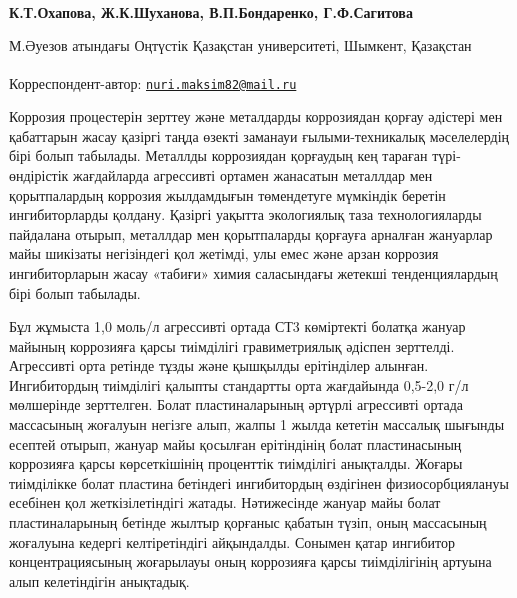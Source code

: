 
\begin{articleheader}


{\bfseries К.Т.Охапова\textsuperscript{\envelope }, Ж.К.Шуханова, В.П.Бондаренко,
Г.Ф.Сагитова}
\end{articleheader}
\begin{affiliation}

М.Әуезов атындағы Оңтүстік Қазақстан университеті, Шымкент, Қазақстан

\raggedright {\bfseries \textsuperscript{\envelope }}Корреспондент-автор:
\href{mailto:nuri.maksim82@mail.ru}{\nolinkurl{nuri.maksim82@mail.ru}}
\end{affiliation}

Коррозия процестерін зерттеу және металдарды коррозиядан қорғау әдістері
мен қабаттарын жасау қазіргі таңда өзекті заманауи ғылыми-техникалық
мәселелердің бірі болып табылады. Металлды коррозиядан қорғаудың кең
тараған түрі- өндірістік жағдайларда агрессивті ортамен жанасатын
металлдар мен қорытпалардың коррозия жылдамдығын төмендетуге мүмкіндік
беретін ингибиторларды қолдану. Қазіргі уақытта экологиялық таза
технологияларды пайдалана отырып, металлдар мен қорытпаларды қорғауға
арналған жануарлар майы шикізаты негізіндегі қол жетімді, улы емес және
арзан коррозия ингибиторларын жасау «табиғи» химия саласындағы жетекші
тенденциялардың бірі болып табылады.

Бұл жұмыста 1,0 моль/л агрессивті ортада СТ3 көміртекті болатқа жануар
майының коррозияға қарсы тиімділігі гравиметриялық әдіспен зерттелді.
Агрессивті орта ретінде тұзды және қышқылды ерітінділер алынған.
Ингибитордың тиімділігі қалыпты стандартты орта жағдайында 0,5-2,0 г/л
мөлшерінде зерттелген. Болат пластиналарының әртүрлі агрессивті ортада
массасының жоғалуын негізге алып, жалпы 1 жылда кететін массалық шығынды
есептей отырып, жануар майы қосылған ерітіндінің болат пластинасының
коррозияға қарсы көрсеткішінің проценттік тиімділігі анықталды. Жоғары
тиімділікке болат пластина бетіндегі ингибитордың өздігінен
физиосорбциялануы есебінен қол жеткізілетіндігі жатады. Нәтижесінде
жануар майы болат пластиналарының бетінде жылтыр қорғаныс қабатын түзіп,
оның массасының жоғалуына кедергі келтіретіндігі айқындалды. Сонымен
қатар ингибитор концентрациясының жоғарылауы оның коррозияға қарсы
тиімділігінің артуына алып келетіндігін анықтадық.

